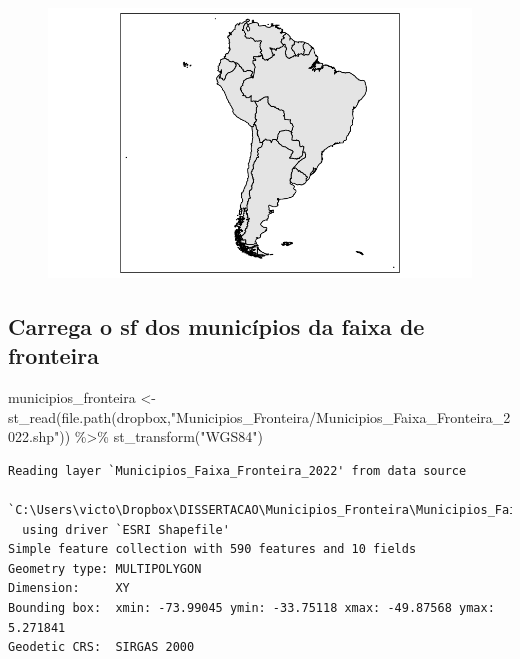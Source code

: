 \documentclass[
  letterpaper,
  DIV=11,
  numbers=noendperiod]{scrartcl}
\newenvironment{Shaded}{\begin{snugshade}}{\end{snugshade}}
\newcommand{\FunctionTok}[1]{\textcolor[rgb]{0.28,0.35,0.67}{#1}}
\newcommand{\NormalTok}[1]{\textcolor[rgb]{0.00,0.23,0.31}{#1}}
\newcommand{\OtherTok}[1]{\textcolor[rgb]{0.00,0.23,0.31}{#1}}
\newcommand{\SpecialCharTok}[1]{\textcolor[rgb]{0.37,0.37,0.37}{#1}}
\newcommand{\StringTok}[1]{\textcolor[rgb]{0.13,0.47,0.30}{#1}}
\begin{document}
\begin{figure}[H]

{\centering \includegraphics{maps_files/figure-pdf/sfamerica-1.pdf}

}

\end{figure}

\hypertarget{carrega-o-sf-dos-municuxedpios-da-faixa-de-fronteira}{%
\subsection{Carrega o sf dos municípios da faixa de
fronteira}\label{carrega-o-sf-dos-municuxedpios-da-faixa-de-fronteira}}

\begin{Shaded}
\begin{Highlighting}[]
\NormalTok{municipios\_fronteira }\OtherTok{\textless{}{-}} \FunctionTok{st\_read}\NormalTok{(}\FunctionTok{file.path}\NormalTok{(dropbox,}\StringTok{"Municipios\_Fronteira/Municipios\_Faixa\_Fronteira\_2022.shp"}\NormalTok{)) }\SpecialCharTok{\%\textgreater{}\%}
  \FunctionTok{st\_transform}\NormalTok{(}\StringTok{"WGS84"}\NormalTok{)}
\end{Highlighting}
\end{Shaded}

\begin{verbatim}
Reading layer `Municipios_Faixa_Fronteira_2022' from data source 
  `C:\Users\victo\Dropbox\DISSERTACAO\Municipios_Fronteira\Municipios_Faixa_Fronteira_2022.shp' 
  using driver `ESRI Shapefile'
Simple feature collection with 590 features and 10 fields
Geometry type: MULTIPOLYGON
Dimension:     XY
Bounding box:  xmin: -73.99045 ymin: -33.75118 xmax: -49.87568 ymax: 5.271841
Geodetic CRS:  SIRGAS 2000
\end{verbatim}
\end{document}
